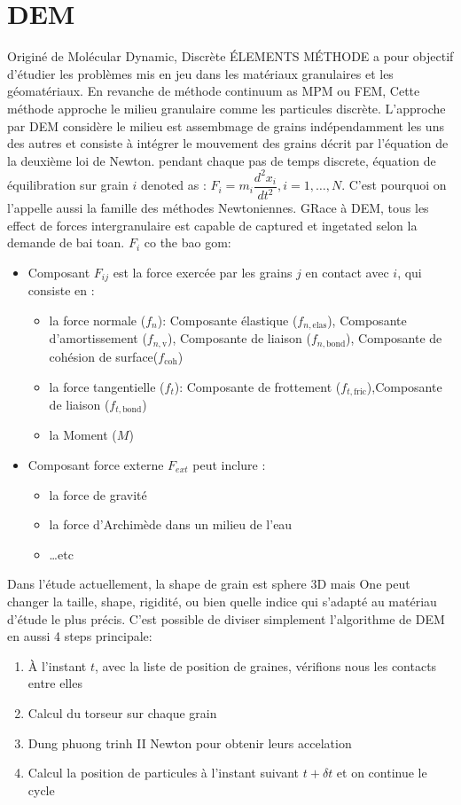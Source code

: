 \documentclass[a4paper,12pt]{report}
\begin{document}
\section{DEM}
Originé de Molécular Dynamic, Discrète ÉLEMENTS MÉTHODE a pour objectif d’étudier les problèmes mis en jeu dans les matériaux granulaires et les géomatériaux. En revanche de méthode continuum as MPM ou FEM, Cette méthode approche le milieu granulaire comme les particules discrète.
L’approche par DEM considère le milieu est assembmage de grains indépendamment les uns des autres et consiste à intégrer le mouvement des grains décrit par l’équation de la deuxième loi de Newton. pendant chaque pas de temps discrete, équation de équilibration sur grain $i$ denoted as : $F_i = m_i \dfrac{d^2x_i}{dt^2}, i = 1,\dots,N$.  
C’est pourquoi on l’appelle aussi la famille des méthodes Newtoniennes.
GRace à DEM, tous les effect de forces intergranulaire est capable de captured et ingetated selon la demande de bai toan. $F_i$ co the bao gom:
\begin{itemize}[label=$\bullet$]
    \item Composant $F_{ij}$ est la force exercée par les grains $j$ en contact avec $i$, qui consiste en :
    \begin{itemize}[label=$\cdot$]
        \item la force normale ($f_n$): Composante élastique ($f_{n,\mathrm{elas}}$), Composante d’amortissement ($f_{n,\mathrm{v}}$), Composante de liaison ($f_{n,\mathrm{bond}}$), Composante de cohésion de surface($f_{\mathrm{coh}}$)
        \item la force tangentielle ($f_t$): Composante de frottement ($f_{t,\mathrm{fric}}$),Composante de liaison ($f_{t,\mathrm{bond}}$) 
        \item la Moment ($M$)
    \end{itemize}
    \item Composant force externe $F_{ext}$ peut inclure :
    \begin{itemize}
        \item la force de gravité
        \item la force d'Archimède dans un milieu de l'eau
        \item \dots etc
    \end{itemize}
\end{itemize} 
Dans l'étude actuellement, la shape de grain est sphere 3D mais One peut changer la taille, shape, rigidité, ou bien quelle indice qui s'adapté au matériau d'étude le plus précis. 
C'est possible de diviser simplement l'algorithme de DEM en aussi 4 steps principale:
\begin{enumerate}
\item À l'instant $t$, avec la liste de position de graines, vérifions nous les contacts entre elles
\item Calcul du torseur sur chaque grain 
\item  Dung phuong trinh II Newton pour obtenir leurs accelation
\item Calcul la position de particules à l'instant suivant $t + \delta t$ et on continue le cycle
\end{enumerate}
\end{document}
